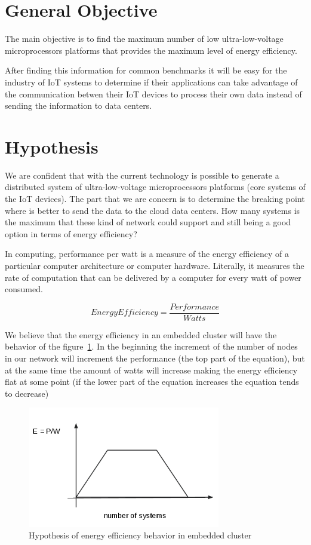 \section{General Objective}
\noindent

The main objective is to find the maximum number of low ultra-low-voltage
microprocessors platforms that provides the maximum level of energy efficiency.

After finding this information for common benchmarks it will be easy for the
industry of IoT systems to determine if their applications can take advantage
of the communication betwen their IoT devices to process their own data instead
of sending the information to data centers.

\section{Hypothesis}
\noindent

We are confident that with the current technology is possible to generate a
distributed system of ultra-low-voltage microprocessors platforms (core
systems of the IoT devices). The part that we are concern is to determine the
breaking point where is better to send the data to the cloud data centers. How
many systems is the maximum that these kind of network could support and still
being a good option in terms of energy efficiency?

In computing, performance per watt is a measure of the energy efficiency of a
particular computer architecture or computer hardware. Literally, it measures
the rate of computation that can be delivered by a computer for every watt of
power consumed.\cite{Burd} 


\begin{equation}
    Energy Efficiency = \dfrac {Performance}{Watts}
\end{equation}

We believe that the energy efficiency in an embedded cluster will have the
behavior of the  figure~\ref{fig:1.2}. In the beginning the increment of the
number of nodes in our network will increment the performance (the top part of
the equation), but at the same time the amount of watts will
increase making the energy efficiency flat at some point (if the lower part of
the equation increases the equation tends to decrease)


\begin{figure}[H]
\centering
\includegraphics[width=0.75\textwidth]{images/graph_1.png}
\caption{Hypothesis of energy efficiency behavior in embedded cluster}
\label{fig:1.2}
\end{figure}

